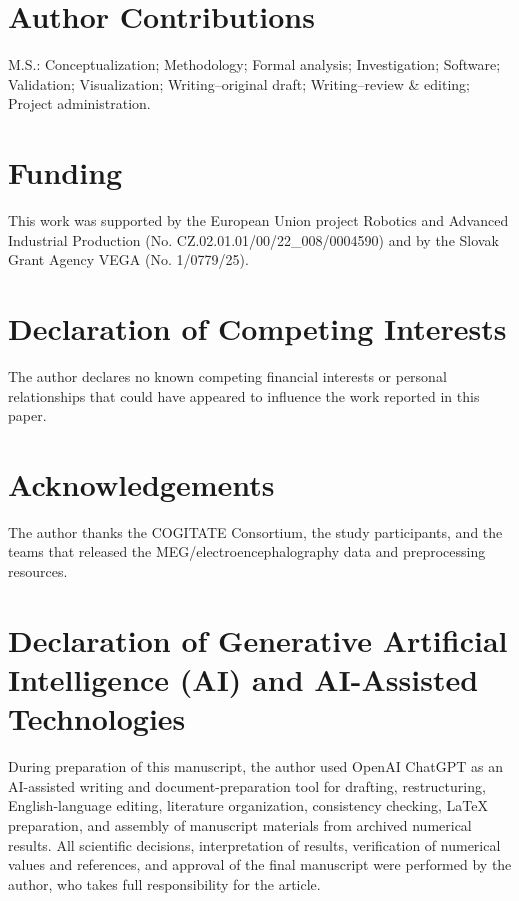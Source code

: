 \documentclass[11pt]{article}
\begin{document}
\section*{Author Contributions}
M.S.: Conceptualization; Methodology; Formal analysis; Investigation; Software; Validation; Visualization; Writing--original draft; Writing--review \& editing; Project administration.

\section*{Funding}
This work was supported by the European Union project Robotics and Advanced Industrial Production (No. CZ.02.01.01/00/22\_008/0004590) and by the Slovak Grant Agency VEGA (No. 1/0779/25).

\section*{Declaration of Competing Interests}
The author declares no known competing financial interests or personal relationships that could have appeared to influence the work reported in this paper.

\section*{Acknowledgements}
The author thanks the COGITATE Consortium, the study participants, and the teams that released the MEG/electroencephalography data and preprocessing resources.

\section*{Declaration of Generative Artificial Intelligence (AI) and AI-Assisted Technologies}
During preparation of this manuscript, the author used OpenAI ChatGPT as an AI-assisted writing and document-preparation tool for drafting, restructuring, English-language editing, literature organization, consistency checking, LaTeX preparation, and assembly of manuscript materials from archived numerical results. All scientific decisions, interpretation of results, verification of numerical values and references, and approval of the final manuscript were performed by the author, who takes full responsibility for the article.
\end{document}
